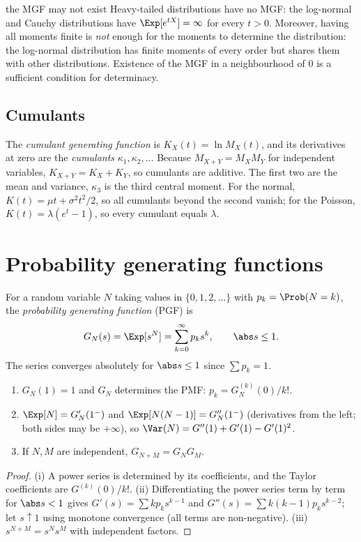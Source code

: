 \begin{nuance}{the MGF may not exist}
Heavy-tailed distributions have no MGF: the log-normal and Cauchy distributions
have $\Exp[e^{tX}]=\infty$ for every $t>0$. Moreover, having all moments finite is
\emph{not} enough for the moments to determine the distribution: the log-normal
distribution has finite moments of every order but shares them with other
distributions. Existence of the MGF in a neighbourhood of $0$ is a sufficient
condition for determinacy.
\end{nuance}

\subsection*{Cumulants}

The \emph{cumulant generating function} is $K_X(t)=\ln M_X(t)$, and its
derivatives at zero are the \emph{cumulants} $\kappa_1,\kappa_2,\dots$ Because
$M_{X+Y}=M_XM_Y$ for independent variables, $K_{X+Y}=K_X+K_Y$, so cumulants are
additive. The first two are the mean and variance, $\kappa_3$ is the third central
moment. For the normal, $K(t)=\mu t+\sigma^2t^2/2$, so all cumulants beyond the
second vanish; for the Poisson, $K(t)=\lambda(e^t-1)$, so every cumulant equals
$\lambda$.

\section{Probability generating functions}

For a random variable $N$ taking values in $\{0,1,2,\dots\}$ with
$p_k=\Prob(N=k)$, the \emph{probability generating function} (PGF) is
\[
G_N(s)=\Exp[s^N]=\sum_{k=0}^\infty p_ks^k,\qquad\abs s\le1.
\]
The series converges absolutely for $\abs s\le1$ since $\sum p_k=1$.

\begin{theorem}\label{thm:pgf}
\begin{enumerate}[label=(\roman*)]
\item $G_N(1)=1$ and $G_N$ determines the PMF: $p_k=G_N^{(k)}(0)/k!$.
\item $\Exp[N]=G_N'(1^-)$ and $\Exp[N(N-1)]=G_N''(1^-)$ (derivatives from the left;
both sides may be $+\infty$), so $\Var(N)=G''(1)+G'(1)-G'(1)^2$.
\item If $N,M$ are independent, $G_{N+M}=G_NG_M$.
\end{enumerate}
\end{theorem}
\begin{proof}
(i) A power series is determined by its coefficients, and the Taylor coefficients
are $G^{(k)}(0)/k!$. (ii) Differentiating the power series term by term for
$\abs s<1$ gives $G'(s)=\sum kp_ks^{k-1}$ and $G''(s)=\sum k(k-1)p_ks^{k-2}$; let
$s\uparrow1$ using monotone convergence (all terms are non-negative). (iii)
$s^{N+M}=s^Ns^M$ with independent factors.
\end{proof}


